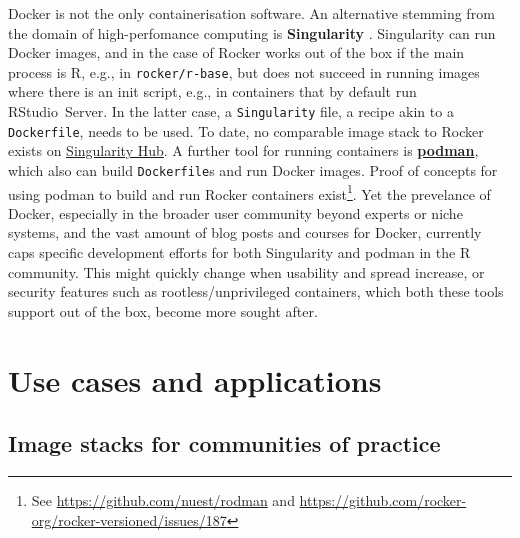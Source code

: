 Docker is not the only containerisation software. An alternative
stemming from the domain of high-perfomance computing is
\textbf{Singularity} \citep{kurtzer_singularity_2017}. Singularity can
run Docker images, and in the case of Rocker works out of the box if the
main process is R, e.g., in \texttt{rocker/r-base}, but does not succeed
in running images where there is an init script, e.g., in containers
that by default run RStudio~Server. In the latter case, a
\texttt{Singularity} file, a recipe akin to a \texttt{Dockerfile}, needs
to be used. To date, no comparable image stack to Rocker exists on
\href{https://singularity-hub.org/}{Singularity Hub}. A further tool for
running containers is
\href{https://github.com/containers/libpod}{\textbf{podman}}, which also
can build \texttt{Dockerfile}s and run Docker images. Proof of concepts
for using podman to build and run Rocker containers
exist\footnote{See \href{https://github.com/nuest/rodman}{https://github.com/nuest/rodman} and \href{https://github.com/rocker-org/rocker-versioned/issues/187}{https://github.com/rocker-org/rocker-versioned/issues/187}}.
Yet the prevelance of Docker, especially in the broader user community
beyond experts or niche systems, and the vast amount of blog posts and
courses for Docker, currently caps specific development efforts for both
Singularity and podman in the R community. This might quickly change
when usability and spread increase, or security features such as
rootless/unprivileged containers, which both these tools support out of
the box, become more sought after.

\hypertarget{use-cases-and-applications}{%
\section{Use cases and applications}\label{use-cases-and-applications}}

\label{applications}

\hypertarget{image-stacks-for-communities-of-practice}{%
\subsection{Image stacks for communities of
practice}\label{image-stacks-for-communities-of-practice}}

